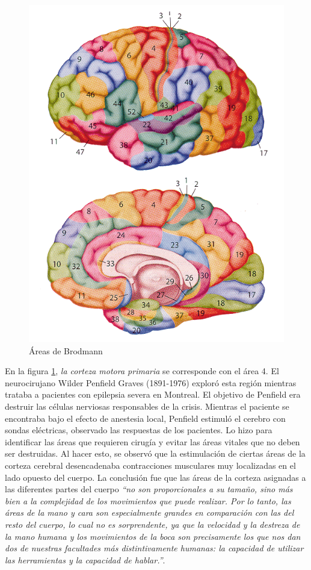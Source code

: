 \begin{figure}[h]
  \begin{center}
    \includegraphics[width=12cm]{images/brodmann-areas.png}
    \caption{Áreas de Brodmann}
    \label{brodmann}
  \end{center}
\end{figure}


En la figura \ref{brodmann}, {\it la corteza motora primaria} se corresponde con el área 4. El neurocirujano Wilder Penfield Graves (1891-1976) exploró esta región mientras trataba a pacientes con epilepsia severa en Montreal. El objetivo de Penfield era destruir las células nerviosas responsables de la crisis. Mientras el paciente se encontraba bajo el efecto de anestesia local, Penfield estimuló el cerebro con sondas eléctricas, observado las respuestas de los pacientes. Lo hizo para identificar las áreas que requieren cirugía y evitar las áreas vitales que no deben ser destruidas. Al hacer esto, se observó que la estimulación de ciertas áreas de la corteza cerebral desencadenaba contracciones musculares muy localizadas en el lado opuesto del cuerpo. La conclusión fue que las áreas de la corteza asignadas a las diferentes partes del cuerpo {\it ``no son proporcionales a su tamaño, sino más bien a la complejidad de los movimientos que puede realizar. Por lo tanto, las áreas de la mano y cara son especialmente grandes en comparación con las del resto del cuerpo, lo cual no es sorprendente, ya que la velocidad y la destreza de la mano humana y los movimientos de la boca son precisamente los que nos dan dos de nuestras facultades más distintivamente humanas: la capacidad de utilizar las herramientas y la capacidad de hablar.''}.

